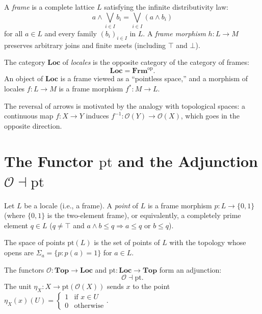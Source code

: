 \begin{definition}[Frame]
A \emph{frame} is a complete lattice $L$ satisfying the infinite distributivity law:
\[
  a \wedge \bigvee_{i\in I} b_i = \bigvee_{i\in I}(a \wedge b_i)
\]
for all $a \in L$ and every family $(b_i)_{i\in I}$ in $L$. A \emph{frame morphism}
$h\colon L \to M$ preserves arbitrary joins and finite meets (including $\top$ and $\bot$).
\end{definition}

\begin{definition}[Locale]
The category $\mathbf{Loc}$ of \emph{locales} is the opposite category of the category of
frames:
\[
  \mathbf{Loc} = \mathbf{Frm}^{\mathrm{op}}.
\]
An object of $\mathbf{Loc}$ is a frame viewed as a ``pointless space,'' and a morphism of
locales $f\colon L \to M$ is a frame morphism $f^*\colon M \to L$.
\end{definition}

\begin{remark}
The reversal of arrows is motivated by the analogy with topological spaces: a continuous
map $f\colon X \to Y$ induces $f^{-1}\colon \mathcal{O}(Y) \to \mathcal{O}(X)$, which
goes in the opposite direction.
\end{remark}

\section{The Functor $\mathrm{pt}$ and the Adjunction $\mathcal{O} \dashv \mathrm{pt}$}

\begin{definition}
Let $L$ be a locale (i.e., a frame). A \emph{point} of $L$ is a frame morphism
$p\colon L \to \{0,1\}$ (where $\{0,1\}$ is the two-element frame), or equivalently, a
completely prime element $q \in L$ ($q \neq \top$ and $a \wedge b \leq q \Rightarrow
a \leq q$ or $b \leq q$).

The space of points $\mathrm{pt}(L)$ is the set of points of $L$ with the topology whose
opens are $\Sigma_a = \{p : p(a) = 1\}$ for $a \in L$.
\end{definition}

\begin{theorem}
The functors $\mathcal{O}\colon \mathbf{Top} \to \mathbf{Loc}$ and
$\mathrm{pt}\colon \mathbf{Loc} \to \mathbf{Top}$ form an adjunction:
\[
  \mathcal{O} \dashv \mathrm{pt}.
\]
The unit $\eta_X\colon X \to \mathrm{pt}(\mathcal{O}(X))$ sends $x$ to the point
$\eta_X(x)(U) = \begin{cases} 1 & \text{if } x \in U \\ 0 & \text{otherwise}\end{cases}$.
\end{theorem}

